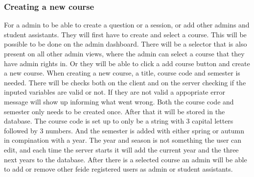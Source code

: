 \subsubsection{Creating a new course}
For a admin to be able to create a question or a session, or add other admins and student assistants. They will first have to create and select a course. This will be possible to be done on the admin dashboard. There will be a selector that is also present on all other admin views, where the admin can select a course that they have admin rights in. Or they will be able to click a add course button and create a new course. When creating a new course, a title, course code and semester is needed. There will be checks both on the client and on the server checking if the inputed variables are valid or not. If they are not valid a appopriate error message will show up informing what went wrong. Both the course code and semester only needs to be created once. After that it will be stored in the database. The course code is set up to only be a string with 3 capital letters followed by 3 numbers. And the semester is added with either spring or autumn in compination with a year. The year and season is not something the user can edit, and each time the server starts it will add the current year and the three next years to the database. After there is a selected course an admin will be able to add or remove other feide registered users as admin or student assistants.